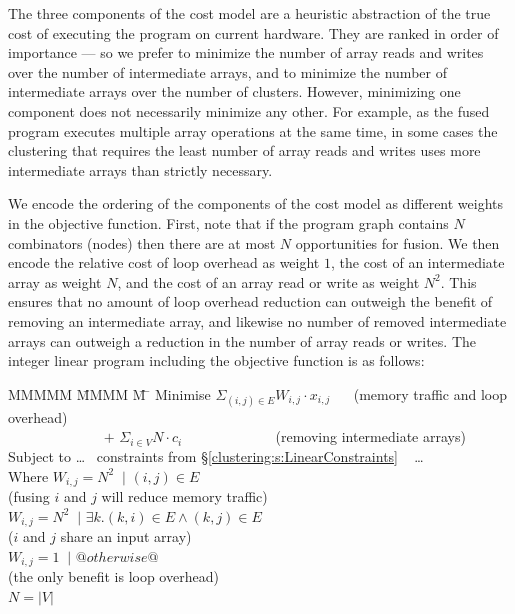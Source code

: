 The three components of the cost model are a heuristic abstraction of the true cost of executing the program on current hardware. They are ranked in order of importance --- so we prefer to minimize the number of array reads and writes over the number of intermediate arrays, and to minimize the number of intermediate arrays over the number of clusters. However, minimizing one component does not necessarily minimize any other. For example, as the fused program executes multiple array operations at the same time, in some cases the clustering that requires the least number of array reads and writes uses more intermediate arrays than strictly necessary.

We encode the ordering of the components of the cost model as different weights in the objective function. First, note that if the program graph contains $N$ combinators (nodes) then there are at most $N$ opportunities for fusion. We then encode the relative cost of loop overhead as weight $1$, the cost of an intermediate array as weight $N$, and the cost of an array read or write as weight $N^2$. This ensures that no amount of loop overhead reduction can outweigh the benefit of removing an intermediate array, and likewise no number of removed intermediate arrays can outweigh a reduction in the number of array reads or writes. The integer linear program including the objective function is as follows:
\begin{tabbing}
MMMMM   \= MMMM \= M \= \kill
Minimise   \>     $\Sigma_{(i,j) \in E} W_{i,j} \cdot x_{i,j}$   
                        ~~ (memory traffic and loop overhead)
\\ ~~~~~~~~~~~~~ $+$ \> $\Sigma_{i \in V} N \cdot c_i$
                        ~~~~~~~~~~~~ (removing intermediate arrays)
\\[1ex]
   Subject to  \> \ldots ~ constraints from \S\ref{clustering:s:LinearConstraints} ~ \ldots 
\\ Where   \> $W_{i,j} = N^2$ \> $~|$ \> $(i,j) \in E $         
\\         \> \> \> (fusing $i$ and $j$ will reduce memory traffic)         
\\         \> $W_{i,j} = N^2$ \> $~|$ \> $\exists k. (k,i) \in E \wedge (k,j) \in E $     
\\         \> \> \> ($i$ and $j$ share an input array)
\\         \> $W_{i,j} = 1$   \> $~|$ \> $@otherwise@$
\\         \> \> \> (the only benefit is loop overhead)
\\         \> $N = |V|$
\end{tabbing}

